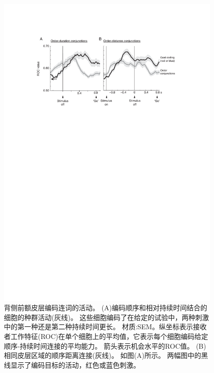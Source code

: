 \begin{figure}
	\centering
	\includegraphics[width=0.65\linewidth]{chap6/6_14}
	\caption{背侧前额皮层编码连词的活动。
		(A)编码顺序和相对持续时间结合的细胞的种群活动(灰线)。
		这些细胞编码了在给定的试验中，两种刺激中的第一种还是第二种持续时间更长。
		材质:SEM。纵坐标表示接收者工作特征(ROC)在单个细胞上的平均值，它表示每个细胞编码给定顺序-持续时间连接的平均能力。
		箭头表示机会水平的ROC值。
		(B)相同皮层区域的顺序距离连接(灰线)。
		如图(A)所示。
		两幅图中的黑线显示了编码目标的活动，红色或蓝色刺激\cite{genovesio2011prefrontal}。}
	\label{fig:6_14}
\end{figure}



